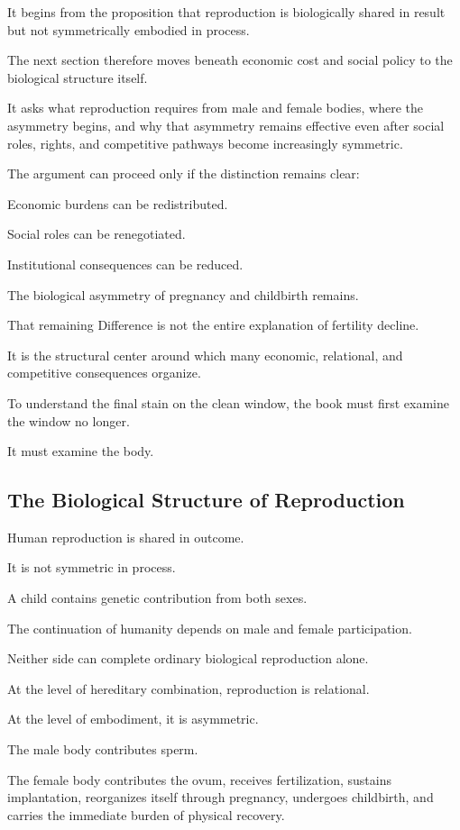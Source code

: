 It begins from the proposition that reproduction is biologically shared in result but not symmetrically embodied in process.

The next section therefore moves beneath economic cost and social policy to the biological structure itself.

It asks what reproduction requires from male and female bodies, where the asymmetry begins, and why that asymmetry remains effective even after social roles, rights, and competitive pathways become increasingly symmetric.

The argument can proceed only if the distinction remains clear:

Economic burdens can be redistributed.

Social roles can be renegotiated.

Institutional consequences can be reduced.

The biological asymmetry of pregnancy and childbirth remains.

That remaining Difference is not the entire explanation of fertility decline.

It is the structural center around which many economic, relational, and competitive consequences organize.

To understand the final stain on the clean window, the book must first examine the window no longer.

It must examine the body.

\subsection*{\textbf{The Biological Structure of Reproduction}}


Human reproduction is shared in outcome.

It is not symmetric in process.

A child contains genetic contribution from both sexes.

The continuation of humanity depends on male and female participation.

Neither side can complete ordinary biological reproduction alone.

At the level of hereditary combination, reproduction is relational.

At the level of embodiment, it is asymmetric.

The male body contributes sperm.

The female body contributes the ovum, receives fertilization, sustains implantation, reorganizes itself through pregnancy, undergoes childbirth, and carries the immediate burden of physical recovery.

